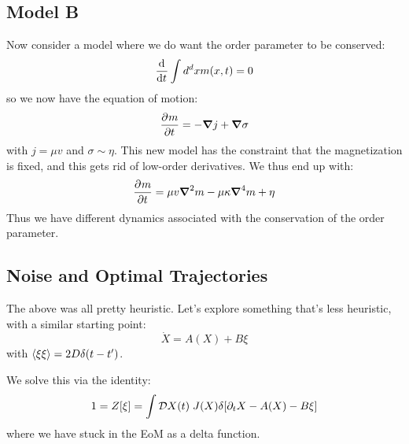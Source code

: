\subsection{Model B}
Now consider a model where we do want the order parameter to be conserved:
\begin{equation}
    \dod{}{t}\int d^dx m(x, t) = 0
\end{equation}
so we now have the equation of motion:
\begin{equation}
    \dpd{m}{t} = -\nabla j + \nabla \sigma
\end{equation}
with $j = \mu v$ and $\sigma \sim \eta$. This new model has the constraint that the magnetization is fixed, and this gets rid of low-order derivatives. We thus end up with:
\begin{equation}
    \dpd{m}{t} = \mu v \nabla^2 m - \mu \kappa \nabla^4 m + \eta
\end{equation}
Thus we have different dynamics associated with the conservation of the order parameter.

\subsection{Noise and Optimal Trajectories}
The above was all pretty heuristic. Let's explore something that's less heuristic, with a similar starting point:
\begin{equation}
    \dot{X} = A(X) + B\xi
\end{equation}
with $\left< \xi\xi \right> = 2D\delta(t - t')$. 

We solve this via the identity:
\begin{equation}
    1 = Z[\xi] = \int \mathcal{D}X(t)\;J(X)\delta[\partial_t X - A(X) - B\xi]
\end{equation}
where we have stuck in the EoM as a delta function.

